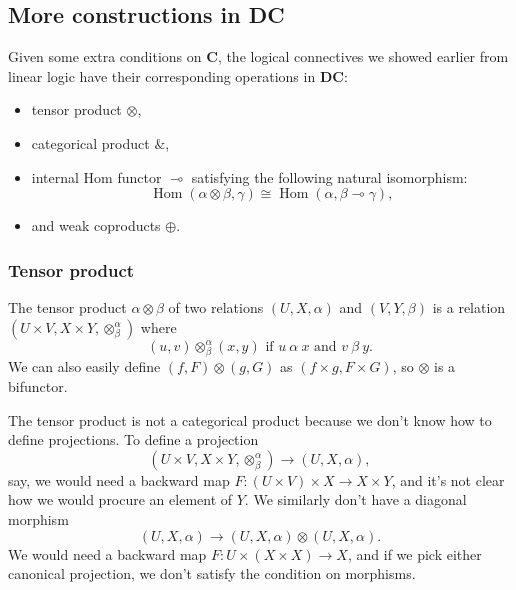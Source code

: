 \documentclass[a4paper]{article}
\newcommand{\DC}{\textbf{DC}}
\newcommand{\C}{\textbf{C}}
\DeclareMathOperator{\Hom}{Hom}
\begin{document}
\subsection{More constructions in \DC}
Given some extra conditions on \C{}, the logical connectives we showed earlier from linear logic have their corresponding operations in \textbf{DC}: 
\begin{itemize}
    \item tensor product $\otimes$,
    \item categorical product $\&$,
    \item internal Hom functor $\multimap$ satisfying the following natural isomorphism:
    \begin{equation*}
        \Hom(\alpha \otimes \beta, \gamma) \cong \Hom(\alpha,\beta\multimap\gamma),
    \end{equation*}
    \item and weak coproducts $\oplus$.
\end{itemize}

\subsubsection{Tensor product}
The tensor product $\alpha\otimes\beta$ of two relations $(U,X,\alpha)$ and $(V,Y,\beta)$ is a relation $(U \times V,X\times Y,\otimes^\alpha_\beta)$ where 
\begin{equation*}
    (u,v)\otimes^\alpha_\beta (x,y)\text{ if } u\ \alpha\ x\text{ and } v\ \beta\ y.
\end{equation*}
We can also easily define $(f,F)\otimes (g,G)$ as $(f\times g, F\times G)$, so $\otimes$ is a bifunctor. 

The tensor product is not a categorical product because we don't know how to define projections. To define a projection 
\begin{equation*}
    (U\times V,X\times Y,\otimes^\alpha_\beta)\to (U,X,\alpha),
\end{equation*}
say, we would need a backward map $F:(U\times V)\times X\to X\times Y$, and it's not clear how we would procure an element of $Y$. 
We similarly don't have a diagonal morphism
\begin{equation*}
    (U,X,\alpha)\to (U,X,\alpha)\otimes (U,X,\alpha).
\end{equation*}
We would need a backward map $F:U\times (X\times X)\to X$, and if we pick either canonical projection, we don't satisfy the condition on morphisms. 
\end{document}
